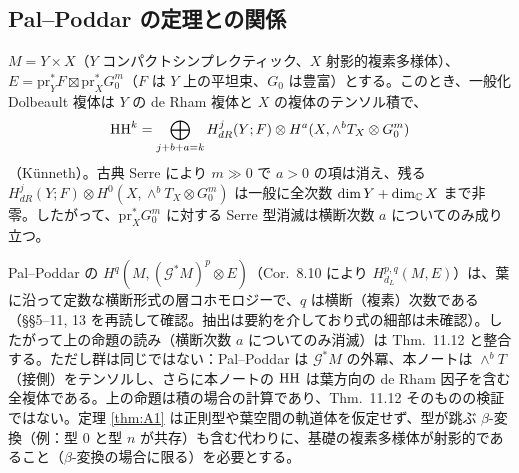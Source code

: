 \subsection{Pal--Poddar の定理との関係}
\begin{prop}[積の場合の整合性]\tP\label{prop:PPprod}
$M=Y\times X$（$Y$ コンパクトシンプレクティック、$X$ 射影的複素多様体）、$E=\mathrm{pr}_Y^*F\boxtimes\mathrm{pr}_X^*G_0^m$（$F$ は $Y$ 上の平坦束、$G_0$ は豊富）とする。このとき、一般化 Dolbeault 複体は $Y$ の de Rham 複体と $X$ の複体のテンソル積で、
\[\mathrm{HH}^k=\bigoplus_{j+b+a=k}H^j_{dR}(Y;F)\otimes H^a(X,\wedge^bT_X\otimes G_0^m)\]
（Künneth）。古典 Serre により $m\gg0$ で $a>0$ の項は消え、残る $H^j_{dR}(Y;F)\otimes H^0(X,\wedge^bT_X\otimes G_0^m)$ は一般に全次数 $\dim Y+\dim_\mathbb C X$ まで非零。したがって、$\mathrm{pr}_X^*G_0^m$ に対する Serre 型消滅は横断次数 $a$ についてのみ成り立つ。
\end{prop}
\begin{rem}[\tQ]
Pal--Poddar の $H^q(M,(\mathcal G^*M)^p\otimes E)$（Cor.\ 8.10 により $H^{p,q}_{d_L}(M,E)$）は、葉に沿って定数な横断形式の層コホモロジーで、$q$ は横断（複素）次数である（\S\S5--11, 13 を再読して確認。抽出は要約を介しており式の細部は未確認）。したがって上の命題の読み（横断次数 $a$ についてのみ消滅）は Thm.\ 11.12 と整合する。ただし群は同じではない：Pal--Poddar は $\mathcal G^*M$ の外冪、本ノートは $\wedge^bT$（接側）をテンソルし、さらに本ノートの $\mathrm{HH}$ は葉方向の de Rham 因子を含む全複体である。上の命題は積の場合の計算であり、Thm.\ 11.12 そのものの検証ではない。定理 \ref{thm:A1} は正則型や葉空間の軌道体を仮定せず、型が跳ぶ $\beta$-変換（例：型 0 と型 $n$ が共存）も含む代わりに、基礎の複素多様体が射影的であること（$\beta$-変換の場合に限る）を必要とする。
\end{rem}

